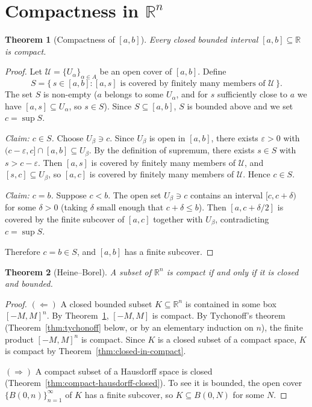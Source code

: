 \documentclass[11pt,a4paper,twoside]{book}
\newtheorem{theorem}{Theorem}[section]
\theoremstyle{remark}
\theoremstyle{definition}
\theoremstyle{definition}
\begin{document}
\section{Compactness in \texorpdfstring{$\mathbb{R}^n$}{Rn}}
\label{sec:compactness-Rn}

\begin{theorem}[{Compactness of $[a,b]$}]\label{thm:closed-interval-compact}
Every closed bounded interval $[a,b] \subseteq \mathbb{R}$ is compact.
\end{theorem}

\begin{proof}
Let $\mathcal{U} = \{U_\alpha\}_{\alpha \in A}$ be an open cover of $[a,b]$.
Define
\[
  S = \bigl\{\, s \in [a,b] : [a,s] \text{ is covered by finitely many
    members of } \mathcal{U} \,\bigr\}.
\]
The set $S$ is non-empty ($a$ belongs to some $U_\alpha$, and for $s$
sufficiently close to $a$ we have $[a,s] \subseteq U_\alpha$, so $s \in S$).
Since $S \subseteq [a,b]$, $S$ is bounded above and we set $c = \sup S$.

\emph{Claim: $c \in S$.}
Choose $U_\beta \ni c$.  Since $U_\beta$ is open in $[a,b]$, there exists
$\varepsilon > 0$ with $(c - \varepsilon, c] \cap [a,b] \subseteq U_\beta$.
By the definition of supremum, there exists $s \in S$ with
$s > c - \varepsilon$.  Then $[a,s]$ is covered by finitely many members
of $\mathcal{U}$, and $[s, c] \subseteq U_\beta$, so $[a,c]$ is covered by
finitely many members of $\mathcal{U}$.  Hence $c \in S$.

\emph{Claim: $c = b$.}
Suppose $c < b$.  The open set $U_\beta \ni c$ contains an interval
$[c, c + \delta)$ for some $\delta > 0$ (taking $\delta$ small enough that
$c + \delta \le b$).  Then $[a, c + \delta/2]$ is covered by the finite
subcover of $[a,c]$ together with $U_\beta$, contradicting
$c = \sup S$.

Therefore $c = b \in S$, and $[a,b]$ has a finite subcover.
\end{proof}

\begin{theorem}[Heine--Borel]\label{thm:heine-borel}
A subset of $\mathbb{R}^n$ is compact if and only if it is closed and bounded.
\end{theorem}

\begin{proof}
$(\Leftarrow)$ A closed bounded subset $K \subseteq \mathbb{R}^n$ is contained
in some box $[-M,M]^n$.  By Theorem~\ref{thm:closed-interval-compact},
$[-M,M]$ is compact.  By Tychonoff's theorem
(Theorem~\ref{thm:tychonoff} below, or by an elementary induction on $n$),
the finite product $[-M,M]^n$ is compact.  Since $K$ is a closed subset of a
compact space, $K$ is compact by Theorem~\ref{thm:closed-in-compact}.

$(\Rightarrow)$ A compact subset of a Hausdorff space is closed
(Theorem~\ref{thm:compact-hausdorff-closed}).  To see it is bounded, the
open cover $\{B(0,n)\}_{n=1}^\infty$ of $K$ has a finite subcover, so
$K \subseteq B(0,N)$ for some $N$.
\end{proof}
\end{document}
